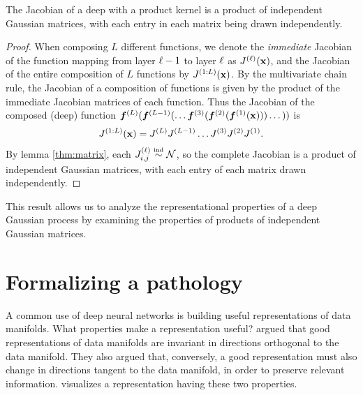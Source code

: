 \documentclass{article} %
\begin{document}
\begin{theorem}
\label{thm:prodjacob}
The Jacobian of a deep \gp{} with a product kernel is a product of independent Gaussian matrices, with each entry in each matrix being drawn independently.
\end{theorem}
%
\begin{proof}
When composing $L$ different functions, we denote the \emph{immediate} Jacobian of the function mapping from layer $\ell -1$ to layer $\ell$ as $J^{(\ell)}({\bf{x}})$, and the Jacobian of the entire composition of $L$ functions by $J^{(1:L)}({\bf{x}})$.
%
By the multivariate chain rule, the Jacobian of a composition of functions is given by the product of the immediate Jacobian matrices of each function.  
%
Thus the Jacobian of the composed (deep) function $\boldsymbol{f}^{(L)}(\boldsymbol{f}^{(L-1)}(\dots \boldsymbol{f}^{(3)}( \boldsymbol{f}^{(2)}( \boldsymbol{f}^{(1)}({\bf{x}})))\dots))$ is
%
%
\begin{align}
 J^{(1:L)}({\bf{x}}) 
= J^{(L)} J^{(L-1)} \dots J^{(3)} J^{(2)} J^{(1)}.
\label{eq:jacobian-of-deep-gp}
\end{align}
%
By lemma \ref{thm:matrix}, each ${J^{(\layerindex)}_{i,j} \simind \mathcal{N}}$, so the complete Jacobian is a product of independent Gaussian matrices, with each entry of each matrix drawn independently.
\end{proof}

This result allows us to analyze the representational properties of a deep Gaussian process by examining the properties of products of independent Gaussian matrices.






\section{Formalizing a pathology}
\label{sec:formalizing-pathology}

A common use of deep neural networks is building useful representations of data manifolds.
What properties make a representation useful?
\citet{rifai2011higher} argued that good representations of data manifolds are invariant in directions orthogonal to the data manifold.
They also argued that, conversely, a good representation must also change in directions tangent to the data manifold, in order to preserve relevant information.
 visualizes a representation having these two properties.
\end{document}
